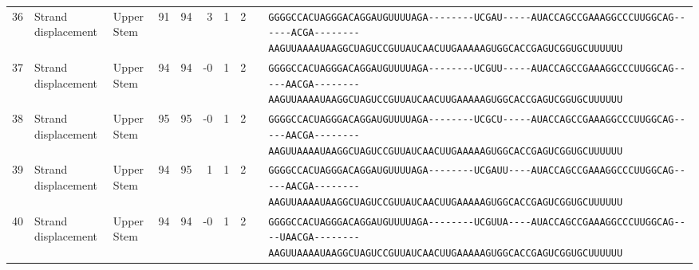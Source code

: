 \begin{tabular}{rllrrrrrcl}
 36 & Strand displacement & Upper Stem & 91 & 94 & 3 & 1 & 2 &  &
 \color{ucsfdarkgrey}\verb|GGGGCCACUAGGGACAGGAU|\color{ucsforange}\verb|GUUUUA|\color{ucsfblue}\verb|GA--------UCGAU-----|\color{ucsfpurple}\verb|AUACCAGCCGAAAGGCCCUUGGCAG|\color{ucsfblue}\verb|------ACGA--------AAGU|\color{ucsforange}\verb|UAAAAUAA|\color{ucsfnavy}\verb|GGCUAGUCC|\color{ucsforange}\verb|GUUAUCA|\color{ucsfteal}\verb|ACUUGAAAAAGUG|\color{ucsforange}\verb|GCACCGAGUCGGUGCUUUUUU| \\

 37 & Strand displacement & Upper Stem & 94 & 94 & -0 & 1 & 2 &  &
 \color{ucsfdarkgrey}\verb|GGGGCCACUAGGGACAGGAU|\color{ucsforange}\verb|GUUUUA|\color{ucsfblue}\verb|GA--------UCGUU-----|\color{ucsfpurple}\verb|AUACCAGCCGAAAGGCCCUUGGCAG|\color{ucsfblue}\verb|-----AACGA--------AAGU|\color{ucsforange}\verb|UAAAAUAA|\color{ucsfnavy}\verb|GGCUAGUCC|\color{ucsforange}\verb|GUUAUCA|\color{ucsfteal}\verb|ACUUGAAAAAGUG|\color{ucsforange}\verb|GCACCGAGUCGGUGCUUUUUU| \\

 38 & Strand displacement & Upper Stem & 95 & 95 & -0 & 1 & 2 &  &
 \color{ucsfdarkgrey}\verb|GGGGCCACUAGGGACAGGAU|\color{ucsforange}\verb|GUUUUA|\color{ucsfblue}\verb|GA--------UCGCU-----|\color{ucsfpurple}\verb|AUACCAGCCGAAAGGCCCUUGGCAG|\color{ucsfblue}\verb|-----AACGA--------AAGU|\color{ucsforange}\verb|UAAAAUAA|\color{ucsfnavy}\verb|GGCUAGUCC|\color{ucsforange}\verb|GUUAUCA|\color{ucsfteal}\verb|ACUUGAAAAAGUG|\color{ucsforange}\verb|GCACCGAGUCGGUGCUUUUUU| \\

 39 & Strand displacement & Upper Stem & 94 & 95 & 1 & 1 & 2 &  &
 \color{ucsfdarkgrey}\verb|GGGGCCACUAGGGACAGGAU|\color{ucsforange}\verb|GUUUUA|\color{ucsfblue}\verb|GA--------UCGAUU----|\color{ucsfpurple}\verb|AUACCAGCCGAAAGGCCCUUGGCAG|\color{ucsfblue}\verb|-----AACGA--------AAGU|\color{ucsforange}\verb|UAAAAUAA|\color{ucsfnavy}\verb|GGCUAGUCC|\color{ucsforange}\verb|GUUAUCA|\color{ucsfteal}\verb|ACUUGAAAAAGUG|\color{ucsforange}\verb|GCACCGAGUCGGUGCUUUUUU| \\

 40 & Strand displacement & Upper Stem & 94 & 94 & -0 & 1 & 2 &  &
 \color{ucsfdarkgrey}\verb|GGGGCCACUAGGGACAGGAU|\color{ucsforange}\verb|GUUUUA|\color{ucsfblue}\verb|GA--------UCGUUA----|\color{ucsfpurple}\verb|AUACCAGCCGAAAGGCCCUUGGCAG|\color{ucsfblue}\verb|----UAACGA--------AAGU|\color{ucsforange}\verb|UAAAAUAA|\color{ucsfnavy}\verb|GGCUAGUCC|\color{ucsforange}\verb|GUUAUCA|\color{ucsfteal}\verb|ACUUGAAAAAGUG|\color{ucsforange}\verb|GCACCGAGUCGGUGCUUUUUU| \\


\end{tabular}
